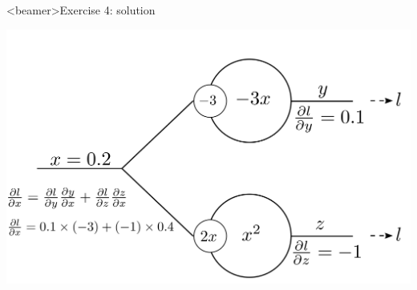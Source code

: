\documentclass[xcolor=pdftex,dvipsnames,table,mathserif]{beamer}
\begin{document}
\begin{frame}<beamer>{Exercise 4: solution}

  \includegraphics[width=\textwidth]{bp_split_sol.png}

\end{frame}
\end{document}
